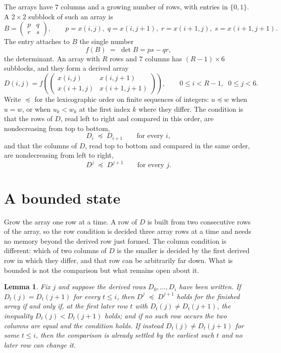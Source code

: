 \documentclass[11pt,a4paper]{article}
\theoremstyle{plain}
\newtheorem{lemma}[theorem]{Lemma}
\theoremstyle{definition}
\begin{document}
The arrays have $7$ columns and a growing number of rows, with entries in $\{0,1\}$. A
$2\times2$ subblock of such an array is
\[
B=\begin{pmatrix} p & q \\ r & s \end{pmatrix},
\qquad p=x(i,j),\; q=x(i,j+1),\; r=x(i+1,j),\; s=x(i+1,j+1).
\]
The entry attaches to $B$ the single number
\[
f(B)\;=\;\det B=ps-qr,
\]
the determinant. An array with $R$ rows and $7$ columns has $(R-1)\times6$ subblocks, and they
form a derived array
\[
D(i,j)=f\!\left(\begin{pmatrix} x(i,j) & x(i,j+1) \\ x(i+1,j) & x(i+1,j+1)\end{pmatrix}
\right),\qquad 0\le i<R-1,\;\; 0\le j<6 .
\]
Write $\preceq$ for the lexicographic order on finite sequences of integers: $u\preceq w$ when
$u=w$, or when $u_k<w_k$ at the first index $k$ where they differ. The condition is that the
rows of $D$, read left to right and compared in this order, are nondecreasing from top to bottom,
\[
D_{i}\;\preceq\;D_{i+1}\qquad\text{for every } i,
\]
and that the columns of $D$, read top to bottom and compared in the same order, are nondecreasing
from left to right,
\[
D^{j}\;\preceq\;D^{j+1}\qquad\text{for every } j .
\]

\section{A bounded state}

Grow the array one row at a time. A row of $D$ is built from two consecutive rows of the array,
so the row condition is decided three array rows at a time and needs no memory beyond the
derived row just formed. The column condition is different: which of two columns of $D$ is the
smaller is decided by the first derived row in which they differ, and that row can be
arbitrarily far down. What is bounded is not the comparison but what remains open about it.

\begin{lemma}\label{lem:bits}
Fix $j$ and suppose the derived rows $D_0,\dots,D_i$ have been written. If $D_t(j)=D_t(j+1)$ for
every $t\le i$, then $D^{j}\;\preceq\;D^{j+1}$ holds for the finished array if and only if,
at the first later row $t$ with $D_t(j)\neq D_t(j+1)$, the inequality $D_t(j)<D_t(j+1)$
holds; and if no such row occurs the two columns are equal and the condition holds. If instead
$D_t(j)\neq D_t(j+1)$ for some $t\le i$, then the comparison is already settled by the earliest
such $t$ and no later row can change it.
\end{lemma}
\end{document}
